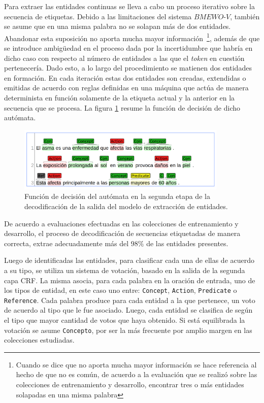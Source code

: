 Para extraer las entidades continuas se lleva a cabo un proceso iterativo sobre la secuencia de etiquetas.
Debido a las limitaciones del sistema $BMEWO$-$V$, también se asume que en una misma palabra no se solapan más de dos entidades.
Abandonar esta suposición no aporta mucha mayor información~\footnote{Cuando se dice que no aporta mucha mayor información se hace referencia al hecho de que no es común, de acuerdo a la evaluación que se realizó sobre las colecciones de entrenamiento y desarrollo, encontrar tres o más entidades solapadas en una misma palabra}, además de que se introduce ambigüedad en el proceso dada por la incertidumbre que habría en dicho caso con respecto al número de entidades a las que el \textit{token} en cuestión pertenecería.
Dado esto, a lo largo del procedimiento se matienen dos entidades en formación.
En cada iteración estas dos entidades son creadas, extendidas o emitidas de acuerdo con reglas definidas en una máquina que actúa de manera determinista en función solamente de la etiqueta actual y la anterior en la secuencia que se procesa.
La figura \ref{fig:automaton} resume la función de decisión de dicho autómata. 

\begin{figure}[h!]
	\centering
	\includegraphics[width = 10cm]{Graphics/automaton.png}
	\caption{Función de decisión del autómata en la segunda etapa de la decodificación de la salida del modelo de extracción de entidades.}\label{fig:automaton}
\end{figure}

De acuerdo a evaluaciones efectuadas en las colecciones de entrenamiento y desarrollo, el proceso de decodificación de secuencias etiquetadas de manera correcta, extrae adecuadamente más del $98\%$ de las entidades presentes.


Luego de identificadas las entidades, para clasificar cada una de ellas de acuerdo a su tipo, se utiliza un sistema de votaci\'on, basado en la salida de la segunda capa CRF.
La misma asocia, para cada palabra en la oración de entrada, uno de los tipos de entidad, en este caso uno entre: \texttt{Concept}, \texttt{Action}, \texttt{Predicate} o \texttt{Reference}.
Cada palabra produce para cada entidad a la que pertenece, un voto de acuerdo al tipo que le fue asociado.
Luego, cada entidad se clasifica de según el tipo que mayor cantidad de votos que haya obtenido. Si está equilibrada la votación se asume \texttt{Concepto}, por ser la más frecuente por amplio margen en las colecciones estudiadas.



















